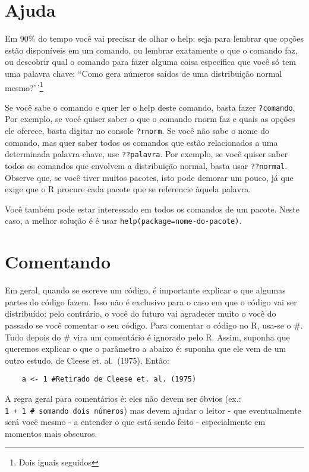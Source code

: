 \documentclass[
]{book}
\begin{document}
\hypertarget{ajuda}{%
\section{Ajuda}\label{ajuda}}

Em 90\% do tempo você vai precisar de olhar o help: seja para lembrar que opções estão disponíveis em um comando, ou lembrar exatamente o que o comando faz, ou descobrir qual o comando para fazer alguma coisa específica que você só tem uma palavra chave: ``Como gera números saídos de uma distribuição normal mesmo?'\,'\footnote{Dois iguais seguidos}

Se você sabe o comando e quer ler o help deste comando, basta fazer \texttt{?comando}. Por exemplo, se você quiser saber o que o comando rnorm faz e quais as opções ele oferece, basta digitar no console \texttt{?rnorm}. Se você não sabe o nome do comando, mas quer saber todos os comandos que estão relacionados a uma determinada palavra chave, use \texttt{??palavra}. Por exemplo, se você quiser saber todos os comandos que envolvem a distribuição normal, basta usar \texttt{??normal}. Observe que, se você tiver muitos pacotes, isto pode demorar um pouco, já que exige que o R procure cada pacote que se referencie àquela palavra.

Você também pode estar interessado em todos os comandos de um pacote. Neste caso, a melhor solução é é usar \texttt{help(package=\textasciigrave{}\textasciigrave{}nome-do-pacote\textquotesingle{}\textquotesingle{})}.

\hypertarget{comentando}{%
\section{Comentando}\label{comentando}}

Em geral, quando se escreve um código, é importante explicar o que algumas partes do código fazem. Isso não é exclusivo para o caso em que o código vai ser distribuído: pelo contrário, o você do futuro vai agradecer muito o você do passado se você comentar o seu código. Para comentar o código no R, usa-se o \#. Tudo depois do \# vira um comentário é ignorado pelo R. Assim, suponha que queremos explicar o que o parâmetro a abaixo é: suponha que ele vem de um outro estudo, de Cleese et. al.~(1975). Então:

\begin{verbatim}
    a <- 1 #Retirado de Cleese et. al. (1975)
\end{verbatim}

A regra geral para comentários é: eles não devem ser óbvios (ex.: \texttt{1\ +\ 1\ \#\ somando\ dois\ números}) mas devem ajudar o leitor - que eventualmente será você mesmo - a entender o que está sendo feito - especialmente em momentos mais obscuros.
\end{document}
